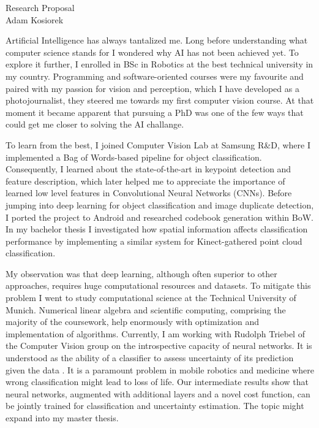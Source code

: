 \documentclass[12pt]{article}
\begin{document}
\begin{center}
{\Large Research Proposal} \\[.1in]
{\large Adam Kosiorek}
\end{center}

\vspace*{.1in}

Artificial Intelligence has always tantalized me. Long before understanding what computer science stands for I wondered why AI has not been achieved yet. To explore it further, I enrolled in BSc in Robotics at the best technical university in my country. Programming and software-oriented courses were my favourite and paired with my passion for vision and perception, which I have developed as a photojournalist, they steered me towards my first computer vision course. At that moment it became apparent that pursuing a PhD was one of the few ways that could get me closer to solving the AI challange.

To learn from the best, I joined Computer Vision Lab at Samsung R\&D, where I implemented a Bag of Words-based pipeline for object classification. Consequently, I learned about the state-of-the-art in keypoint detection and feature description, which later helped me to appreciate the importance of learned low level features in Convolutional Neural Networks (CNNs). Before jumping into deep learning for object classification and image duplicate detection, I ported the project to Android and researched codebook generation within BoW. In my bachelor thesis I investigated how spatial information affects classification performance by implementing a similar system for Kinect-gathered point cloud classification.

My observation was that deep learning, although often superior to other approaches, requires huge computational resources and datasets. To mitigate this problem I went to study computational science at the Technical University of Munich. Numerical linear algebra and scientific computing, comprising the majority of the coursework, help enormously with optimization and implementation of algorithms. Currently, I am working with Rudolph Triebel of the Computer Vision group on the introspective capacity of neural networks. It is understood as the ability of a classifier to assess uncertainty of its prediction given the data \cite{introspective}. It is a paramount problem in mobile robotics and medicine where wrong classification might lead to loss of life. Our intermediate results show that neural networks, augmented with additional layers and a novel cost function, can be jointly trained for classification and uncertainty estimation. The topic might expand into my master thesis.
\end{document}
